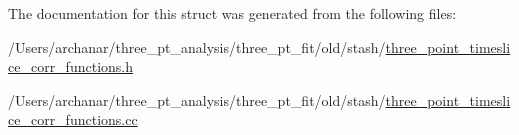 The documentation for this struct was generated from the following files\+:\begin{DoxyCompactItemize}
\item 
/\+Users/archanar/three\+\_\+pt\+\_\+analysis/three\+\_\+pt\+\_\+fit/old/stash/\mbox{\hyperlink{old_2stash_2three__point__timeslice__corr__functions_8h}{three\+\_\+point\+\_\+timeslice\+\_\+corr\+\_\+functions.\+h}}\item 
/\+Users/archanar/three\+\_\+pt\+\_\+analysis/three\+\_\+pt\+\_\+fit/old/stash/\mbox{\hyperlink{old_2stash_2three__point__timeslice__corr__functions_8cc}{three\+\_\+point\+\_\+timeslice\+\_\+corr\+\_\+functions.\+cc}}\end{DoxyCompactItemize}
